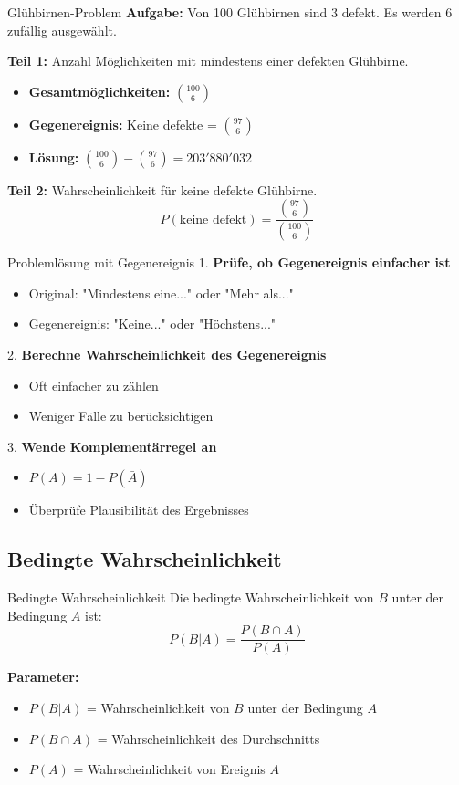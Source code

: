 \begin{example}{Glühbirnen-Problem}
\textbf{Aufgabe:} Von 100 Glühbirnen sind 3 defekt. Es werden 6 zufällig ausgewählt.

\textbf{Teil 1:} Anzahl Möglichkeiten mit mindestens einer defekten Glühbirne.
\begin{itemize}
\item \textbf{Gesamtmöglichkeiten:} $\binom{100}{6}$
\item \textbf{Gegenereignis:} Keine defekte = $\binom{97}{6}$
\item \textbf{Lösung:} $\binom{100}{6} - \binom{97}{6} = 203'880'032$
\end{itemize}

\textbf{Teil 2:} Wahrscheinlichkeit für keine defekte Glühbirne.
$$P(\text{keine defekt}) = \frac{\binom{97}{6}}{\binom{100}{6}}$$
\end{example}

\begin{KR}{Problemlösung mit Gegenereignis}
1. \textbf{Prüfe, ob Gegenereignis einfacher ist}
   \begin{itemize}
   \item Original: "Mindestens eine..." oder "Mehr als..."
   \item Gegenereignis: "Keine..." oder "Höchstens..."
   \end{itemize}

2. \textbf{Berechne Wahrscheinlichkeit des Gegenereignis}
   \begin{itemize}
   \item Oft einfacher zu zählen
   \item Weniger Fälle zu berücksichtigen
   \end{itemize}

3. \textbf{Wende Komplementärregel an}
   \begin{itemize}
   \item $P(A) = 1 - P(\bar{A})$
   \item Überprüfe Plausibilität des Ergebnisses
   \end{itemize}
\end{KR}

\subsection{Bedingte Wahrscheinlichkeit}

\begin{definition}{Bedingte Wahrscheinlichkeit}
Die bedingte Wahrscheinlichkeit von $B$ unter der Bedingung $A$ ist:
$$P(B|A)=\frac{P(B \cap A)}{P(A)}$$

\textbf{Parameter:}
\begin{itemize}
    \item $P(B|A)$ = Wahrscheinlichkeit von $B$ unter der Bedingung $A$
    \item $P(B \cap A)$ = Wahrscheinlichkeit des Durchschnitts
    \item $P(A)$ = Wahrscheinlichkeit von Ereignis $A$
\end{itemize}
\end{definition}

